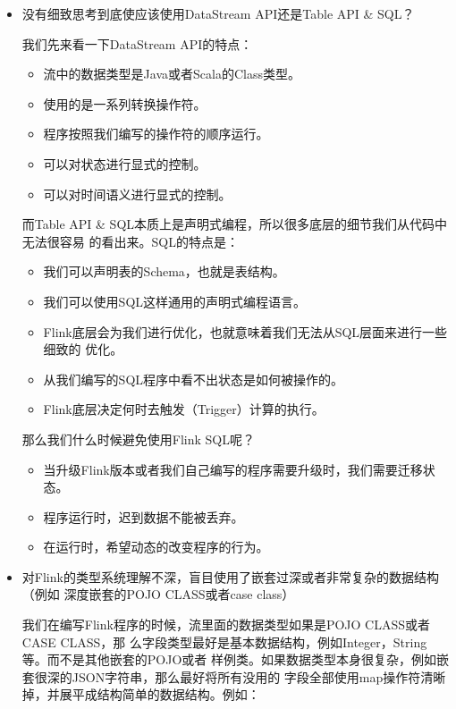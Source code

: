 \documentclass[cn,11pt,chinese]{elegantbook}
\begin{document}
\begin{itemize}
\item 没有细致思考到底使应该使用DataStream API还是Table API \& SQL？

  我们先来看一下DataStream API的特点：

  \begin{itemize}
  \item 流中的数据类型是Java或者Scala的Class类型。
  \item 使用的是一系列转换操作符。
  \item 程序按照我们编写的操作符的顺序运行。
  \item 可以对状态进行显式的控制。
  \item 可以对时间语义进行显式的控制。
  \end{itemize}

  而Table API \& SQL本质上是声明式编程，所以很多底层的细节我们从代码中无法很容易
  的看出来。SQL的特点是：

  \begin{itemize}
  \item 我们可以声明表的Schema，也就是表结构。
  \item 我们可以使用SQL这样通用的声明式编程语言。
  \item Flink底层会为我们进行优化，也就意味着我们无法从SQL层面来进行一些细致的
      优化。
  \item 从我们编写的SQL程序中看不出状态是如何被操作的。
  \item Flink底层决定何时去触发（Trigger）计算的执行。
  \end{itemize}

  那么我们什么时候避免使用Flink SQL呢？

  \begin{itemize}
  \item 当升级Flink版本或者我们自己编写的程序需要升级时，我们需要迁移状态。
  \item 程序运行时，迟到数据不能被丢弃。
  \item 在运行时，希望动态的改变程序的行为。
  \end{itemize}
  
\item 对Flink的类型系统理解不深，盲目使用了嵌套过深或者非常复杂的数据结构（例如
  深度嵌套的POJO CLASS或者case class）

  我们在编写Flink程序的时候，流里面的数据类型如果是POJO CLASS或者CASE CLASS，那
  么字段类型最好是基本数据结构，例如Integer，String等。而不是其他嵌套的POJO或者
  样例类。如果数据类型本身很复杂，例如嵌套很深的JSON字符串，那么最好将所有没用的
  字段全部使用map操作符清晰掉，并展平成结构简单的数据结构。例如：


\end{itemize}
\end{document}
